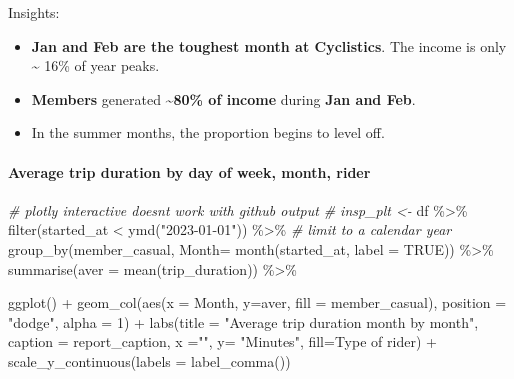 \documentclass[
]{article}
\newenvironment{Shaded}{\begin{snugshade}}{\end{snugshade}}
\newcommand{\AttributeTok}[1]{\textcolor[rgb]{0.77,0.63,0.00}{#1}}
\newcommand{\CommentTok}[1]{\textcolor[rgb]{0.56,0.35,0.01}{\textit{#1}}}
\newcommand{\ConstantTok}[1]{\textcolor[rgb]{0.00,0.00,0.00}{#1}}
\newcommand{\DecValTok}[1]{\textcolor[rgb]{0.00,0.00,0.81}{#1}}
\newcommand{\FunctionTok}[1]{\textcolor[rgb]{0.00,0.00,0.00}{#1}}
\newcommand{\NormalTok}[1]{#1}
\newcommand{\SpecialCharTok}[1]{\textcolor[rgb]{0.00,0.00,0.00}{#1}}
\newcommand{\StringTok}[1]{\textcolor[rgb]{0.31,0.60,0.02}{#1}}
\begin{document}
Insights:

\begin{itemize}
\item
  \textbf{Jan and Feb are the toughest month at Cyclistics}. The income
  is only \textasciitilde{} 16\% of year peaks.
\item
  \textbf{Members} generated \textbf{\textasciitilde80\% of income}
  during \textbf{Jan and Feb}.
\item
  In the summer months, the proportion begins to level off.
\end{itemize}

\hypertarget{average-trip-duration-by-day-of-week-month-rider}{%
\paragraph{Average trip duration by day of week, month,
rider}\label{average-trip-duration-by-day-of-week-month-rider}}

\begin{Shaded}
\begin{Highlighting}[]
\CommentTok{\# plotly interactive doesn\textquotesingle{}t work with github output}
\CommentTok{\# insp\_plt \textless{}{-}}
\NormalTok{df }\SpecialCharTok{\%\textgreater{}\%} 
  \FunctionTok{filter}\NormalTok{(started\_at }\SpecialCharTok{\textless{}} \FunctionTok{ymd}\NormalTok{(}\StringTok{"2023{-}01{-}01"}\NormalTok{)) }\SpecialCharTok{\%\textgreater{}\%} \CommentTok{\# limit to a calendar year}
  \FunctionTok{group\_by}\NormalTok{(member\_casual, }\AttributeTok{Month=}  \FunctionTok{month}\NormalTok{(started\_at, }\AttributeTok{label =} \ConstantTok{TRUE}\NormalTok{)) }\SpecialCharTok{\%\textgreater{}\%}
  \FunctionTok{summarise}\NormalTok{(}\AttributeTok{aver =} \FunctionTok{mean}\NormalTok{(trip\_duration)) }\SpecialCharTok{\%\textgreater{}\%}
  
  \FunctionTok{ggplot}\NormalTok{() }\SpecialCharTok{+}
  \FunctionTok{geom\_col}\NormalTok{(}\FunctionTok{aes}\NormalTok{(}\AttributeTok{x =}\NormalTok{ Month, }\AttributeTok{y=}\NormalTok{aver, }\AttributeTok{fill =}\NormalTok{ member\_casual),}
           \AttributeTok{position =} \StringTok{"dodge"}\NormalTok{, }\AttributeTok{alpha =} \DecValTok{1}\NormalTok{) }\SpecialCharTok{+}
  \FunctionTok{labs}\NormalTok{(}\AttributeTok{title =} \StringTok{"Average trip duration month by month"}\NormalTok{,}
       \AttributeTok{caption =}\NormalTok{ report\_caption,}
       \AttributeTok{x =}\StringTok{""}\NormalTok{, }\AttributeTok{y=} \StringTok{"Minutes"}\NormalTok{,}
       \AttributeTok{fill=}\StringTok{\textquotesingle{}Type of rider\textquotesingle{}}\NormalTok{) }\SpecialCharTok{+}
  \FunctionTok{scale\_y\_continuous}\NormalTok{(}\AttributeTok{labels =} \FunctionTok{label\_comma}\NormalTok{())}
\end{Highlighting}
\end{Shaded}
\end{document}
